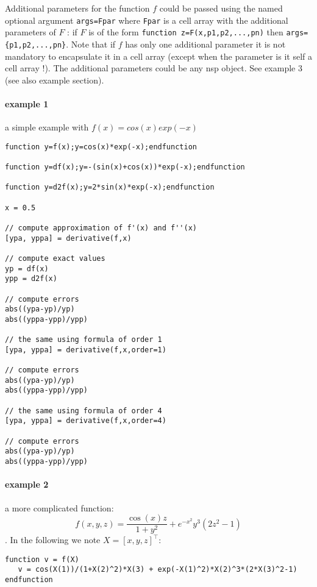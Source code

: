 \begin{mandescription}
Additional parameters for the function $f$ could be passed using the
named optional argument \verb+args=Fpar+  where \verb+Fpar+ is a 
cell array with the additional parameters of $F$ : if $F$ is of the form 
\verb+function z=F(x,p1,p2,...,pn)+ then \verb+args={p1,p2,...,pn}+. 
Note that if $f$ has only one additional parameter it is not mandatory 
to encapsulate it in a cell array (except when the parameter is it 
self a cell array !). The additional parameters could be any nsp object.
See example 3 (see also  example section).

\end{mandescription}

\begin{examples}
  
\paragraph{example 1} a simple example with $f(x)=cos(x)exp(-x)$
\begin{Verbatim}
function y=f(x);y=cos(x)*exp(-x);endfunction

function y=df(x);y=-(sin(x)+cos(x))*exp(-x);endfunction

function y=d2f(x);y=2*sin(x)*exp(-x);endfunction

x = 0.5 

// compute approximation of f'(x) and f''(x) 
[ypa, yppa] = derivative(f,x) 

// compute exact values 
yp = df(x) 
ypp = d2f(x) 

// compute errors 
abs((ypa-yp)/yp) 
abs((yppa-ypp)/ypp) 

// the same using formula of order 1 
[ypa, yppa] = derivative(f,x,order=1) 

// compute errors 
abs((ypa-yp)/yp) 
abs((yppa-ypp)/ypp) 

// the same using formula of order 4 
[ypa, yppa] = derivative(f,x,order=4) 

// compute errors 
abs((ypa-yp)/yp) 
abs((yppa-ypp)/ypp)
\end{Verbatim}

\paragraph{example 2} a more complicated function:
$$f(x,y,z) = \frac{\cos(x) z}{1+y^2} + e^{-x^2} y^3 (2z^2-1)$$.
In the following we note $X = [x,y,z]^{\top}$:
\begin{Verbatim}
function v = f(X)
   v = cos(X(1))/(1+X(2)^2)*X(3) + exp(-X(1)^2)*X(2)^3*(2*X(3)^2-1)
endfunction


\end{Verbatim}
\end{examples}
